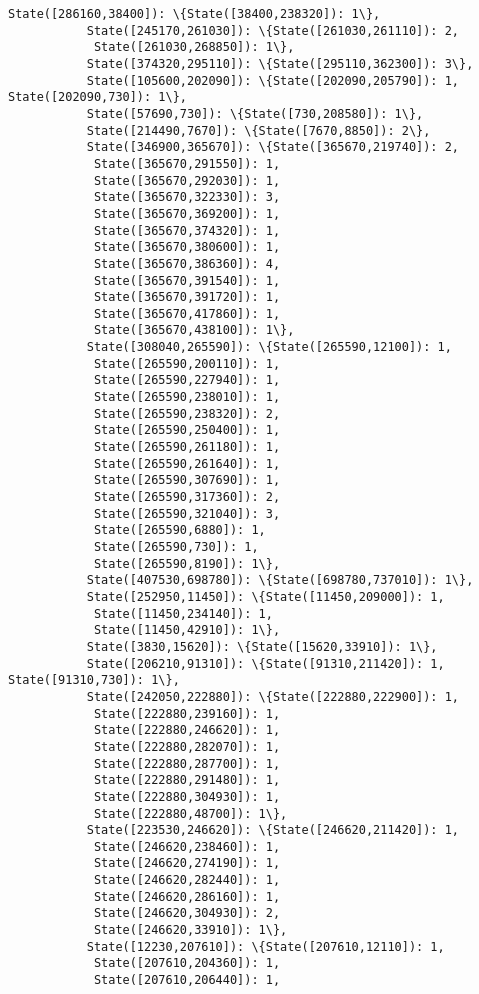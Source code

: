 \documentclass[11pt]{article}
\begin{document}
\begin{Verbatim}[commandchars=\\\{\}]
           State([286160,38400]): \{State([38400,238320]): 1\},
           State([245170,261030]): \{State([261030,261110]): 2,
            State([261030,268850]): 1\},
           State([374320,295110]): \{State([295110,362300]): 3\},
           State([105600,202090]): \{State([202090,205790]): 1, State([202090,730]): 1\},
           State([57690,730]): \{State([730,208580]): 1\},
           State([214490,7670]): \{State([7670,8850]): 2\},
           State([346900,365670]): \{State([365670,219740]): 2,
            State([365670,291550]): 1,
            State([365670,292030]): 1,
            State([365670,322330]): 3,
            State([365670,369200]): 1,
            State([365670,374320]): 1,
            State([365670,380600]): 1,
            State([365670,386360]): 4,
            State([365670,391540]): 1,
            State([365670,391720]): 1,
            State([365670,417860]): 1,
            State([365670,438100]): 1\},
           State([308040,265590]): \{State([265590,12100]): 1,
            State([265590,200110]): 1,
            State([265590,227940]): 1,
            State([265590,238010]): 1,
            State([265590,238320]): 2,
            State([265590,250400]): 1,
            State([265590,261180]): 1,
            State([265590,261640]): 1,
            State([265590,307690]): 1,
            State([265590,317360]): 2,
            State([265590,321040]): 3,
            State([265590,6880]): 1,
            State([265590,730]): 1,
            State([265590,8190]): 1\},
           State([407530,698780]): \{State([698780,737010]): 1\},
           State([252950,11450]): \{State([11450,209000]): 1,
            State([11450,234140]): 1,
            State([11450,42910]): 1\},
           State([3830,15620]): \{State([15620,33910]): 1\},
           State([206210,91310]): \{State([91310,211420]): 1, State([91310,730]): 1\},
           State([242050,222880]): \{State([222880,222900]): 1,
            State([222880,239160]): 1,
            State([222880,246620]): 1,
            State([222880,282070]): 1,
            State([222880,287700]): 1,
            State([222880,291480]): 1,
            State([222880,304930]): 1,
            State([222880,48700]): 1\},
           State([223530,246620]): \{State([246620,211420]): 1,
            State([246620,238460]): 1,
            State([246620,274190]): 1,
            State([246620,282440]): 1,
            State([246620,286160]): 1,
            State([246620,304930]): 2,
            State([246620,33910]): 1\},
           State([12230,207610]): \{State([207610,12110]): 1,
            State([207610,204360]): 1,
            State([207610,206440]): 1,

\end{Verbatim}
\end{document}
